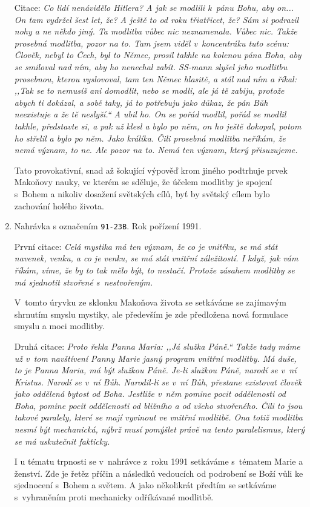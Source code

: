 \begin{enumerate}
{    Citace: \textit{%
      Co lidí nenávidělo Hitlera? A jak se modlili k~pánu Bohu, aby on... On tam
      vydržel šest let, že? A ještě to od roku třiatřicet, že? Sám si podrazil
      nohy a ne někdo jiný. Ta modlitba vůbec nic neznamenala. Vůbec nic. Takže
      prosebná modlitba, pozor na to. Tam jsem viděl v~koncentráku tuto scénu:
      Člověk, nebyl to Čech, byl to Němec, prosil takhle na kolenou pána Boha,
      aby se smiloval nad ním, aby ho nenechal zabít. SS-mann slyšel jeho
      modlitbu prosebnou, kterou vyslovoval, tam ten Němec hlasitě, a stál nad
      ním a říkal: ,,Tak se to nemusíš ani domodlit, nebo se modli, ale já tě
      zabiju, protože abych ti dokázal, a sobě taky, já to potřebuju jako důkaz,
      že pán Bůh neexistuje a že tě neslyší.`` A ubil ho. On se pořád modlil,
      pořád se modlil takhle, představte si, a pak už klesl a bylo po něm, on ho
      ještě dokopal, potom ho střelil a bylo po něm. Jako králíka. Čili prosebná
      modlitba neříkám, že nemá význam, to ne. Ale pozor na to. Nemá ten význam,
      který přisuzujeme.
    }

    Tato provokativní, snad až šokující výpověď krom jiného podtrhuje prvek
    Makoňovy nauky, ve kterém se sděluje, že účelem modlitby je spojení s~Bohem
    a nikoliv dosažení světských cílů, byť by světský cílem bylo zachování
    holého života.
  }
  \item{
    Nahrávka s označením \texttt{91-23B}.
    Rok pořízení 1991.

    První citace: \textit{%
      Celá mystika má ten význam, že co je vnitřku, se má stát navenek, venku, a
      co je venku, se má stát vnitřní záležitostí. I když, jak vám říkám, víme,
      že by to tak mělo být, to nestačí. Protože zásahem modlitby se má
      sjednotit stvořené s~nestvořeným.
    }

    V~tomto úryvku ze sklonku Makoňova života se setkáváme se zajímavým shrnutím
    smyslu mystiky, ale především je zde předložena nová formulace smyslu a moci
    modlitby.

    Druhá citace: \textit{%
      Proto řekla Panna Maria: ,,Já služka Páně.`` Takže tady máme už v~tom
      navštívení Panny Marie jasný program vnitřní modlitby. Má duše, to je
      Panna Maria, má být služkou Páně. Je-li služkou Páně, narodí se v~ní
      Kristus. Narodí se v~ní Bůh. Narodil-li se v~ní Bůh, přestane existovat
      člověk jako oddělená bytost od Boha. Jestliže v~něm pomine pocit
      oddělenosti od Boha, pomine pocit oddělenosti od bližního a od všeho
      stvořeného. Čili to jsou takové paralely, které se mají vyvinout ve
      vnitřní modlitbě. Ona totiž modlitba nesmí být mechanická, nýbrž musí
      pomýšlet právě na tento paralelismus, který se má uskutečnit fakticky.
    }

    I u tématu trpnosti se v~nahrávce z~roku 1991 setkáváme s~tématem Marie a
    ženství. Zde je řetěz příčin a následků vedoucích od podrobení se Boží vůli
    ke sjednocení s~Bohem a světem. A jako několikrát předtím se setkáváme
    s~vyhraněním proti mechanicky odříkávané modlitbě.
  }
\end{enumerate}




